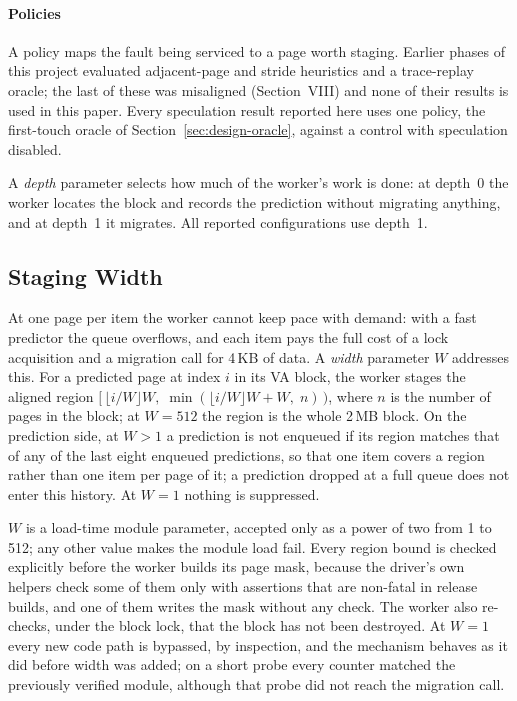 \paragraph{Policies}
A policy maps the fault being serviced to a page worth staging. Earlier
phases of this project evaluated adjacent-page and stride heuristics and a
trace-replay oracle; the last of these was misaligned
(Section~VIII) and none of their results is used in this paper. Every
speculation result reported here uses one policy, the first-touch oracle of
Section~\ref{sec:design-oracle}, against a control with speculation disabled.

A \emph{depth} parameter selects how much of the worker's work is done:
at depth~0 the worker locates the block and records the prediction without
migrating anything, and at depth~1 it migrates. All
reported configurations use depth~1.

\subsection{Staging Width}
\label{sec:design-width}

At one page per item the worker cannot keep pace with demand: with a fast
predictor the queue overflows, and each item pays the full cost of a lock
acquisition and a migration call for 4\,KB of data. A \emph{width} parameter
$W$ addresses this. For a predicted page at index $i$ in its VA block, the
worker stages the aligned region
$[\,\lfloor i/W \rfloor W,\; \min(\lfloor i/W \rfloor W + W,\; n)\,)$, where $n$
is the number of pages in the block; at $W = 512$ the region is the whole
2\,MB block. On the prediction side, at $W > 1$ a prediction is not enqueued if its
region matches that of any of the last eight enqueued predictions, so that one
item covers a region rather than one item per page of it; a prediction dropped
at a full queue does not enter this history. At $W = 1$ nothing is suppressed.

$W$ is a load-time module parameter, accepted only as a power of two from 1
to 512; any other value makes the module load fail. Every region bound is
checked explicitly before the worker builds its page mask, because the
driver's own helpers check some of them only with assertions that are
non-fatal in release builds, and one of them writes the mask without any
check. The worker also re-checks, under the block lock, that the block has
not been destroyed. At $W = 1$ every new code path is bypassed, by inspection, and the mechanism
behaves as it did before width was added; on a short probe every counter
matched the previously verified module, although that probe did not reach the
migration call.

